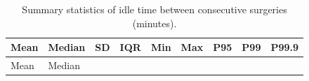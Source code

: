 \documentclass[
]{article}
\begin{document}
\begin{longtable}[]{@{}
  >{\centering\arraybackslash}p{}
  >{\centering\arraybackslash}p{}
  >{\centering\arraybackslash}p{}
  >{\centering\arraybackslash}p{}
  >{\centering\arraybackslash}p{}
  >{\centering\arraybackslash}p{}
  >{\centering\arraybackslash}p{}
  >{\centering\arraybackslash}p{}
  >{\centering\arraybackslash}p{}@{}}
\caption{Summary statistics of idle time between consecutive surgeries
(minutes). \label{tab:idle_summary}}\tabularnewline
\toprule\noalign{}
\begin{minipage}[b]{\linewidth}\centering
Mean
\end{minipage} & \begin{minipage}[b]{\linewidth}\centering
Median
\end{minipage} & \begin{minipage}[b]{\linewidth}\centering
SD
\end{minipage} & \begin{minipage}[b]{\linewidth}\centering
IQR
\end{minipage} & \begin{minipage}[b]{\linewidth}\centering
Min
\end{minipage} & \begin{minipage}[b]{\linewidth}\centering
Max
\end{minipage} & \begin{minipage}[b]{\linewidth}\centering
P95
\end{minipage} & \begin{minipage}[b]{\linewidth}\centering
P99
\end{minipage} & \begin{minipage}[b]{\linewidth}\centering
P99.9
\end{minipage} \\
\midrule\noalign{}
\endfirsthead
\toprule\noalign{}
\begin{minipage}[b]{\linewidth}\centering
Mean
\end{minipage} & \begin{minipage}[b]{\linewidth}\centering
Median
\end{minipage} & \begin{minipage}[b]{\linewidth}\centering

\end{minipage}
\end{longtable}
\end{document}
